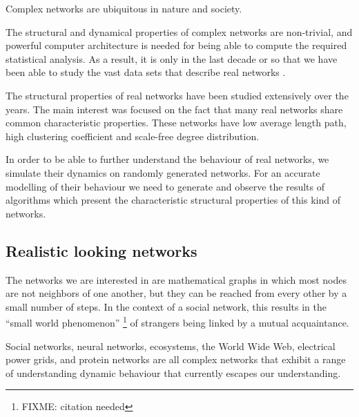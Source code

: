 \documentclass[a4paper,11pt,titlepage]{article}
\begin{document}
Complex networks are ubiquitous in nature and society.

The structural and dynamical properties of complex networks are non-trivial, and
powerful computer architecture is needed for being able to compute the required
statistical analysis. As a result, it is only in the last decade or so that we
have been able to study the vast data sets that describe real networks
\cite{oconn11}.

The structural properties of real networks have been studied extensively over
the years. The main interest was focused on the fact that many real networks
share common characteristic properties. These networks have low average length
path, high clustering coefficient and scale-free degree distribution.

In order to be able to further understand the behaviour of real networks, we
simulate their dynamics on randomly generated networks.  For an accurate
modelling of their behaviour we need to generate and observe the results of
algorithms which present the characteristic structural properties of this kind
of networks.

\subsection{Realistic looking networks}


The networks we are interested in are mathematical graphs in which most nodes
are not neighbors of one another, but they can be reached from every other by a
small number of steps. In the context of a social network, this results in the
``small world phenomenon'' \footnote{FIXME: citation needed} of strangers
being linked by a mutual acquaintance.


Social networks, neural networks, ecosystems, the World Wide Web, electrical
power grids, and protein networks are all complex networks that exhibit a range
of understanding dynamic behaviour that currently escapes our understanding.
\end{document}
